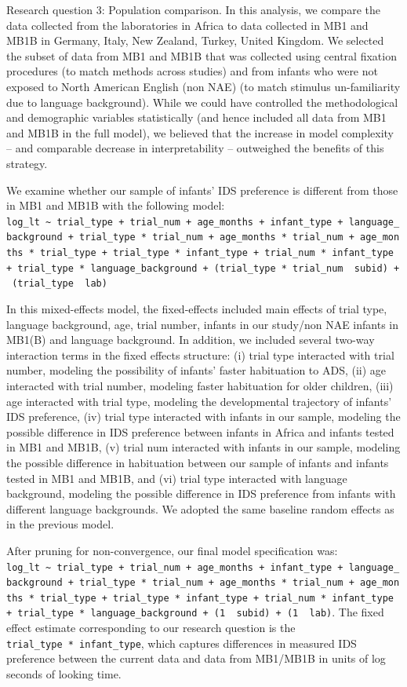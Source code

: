 \documentclass[
  ,man,floatsintext]{apa6}
\begin{document}
Research question 3: Population comparison. In this analysis, we compare the data collected from the laboratories in Africa to data collected in MB1 and MB1B in Germany, Italy, New Zealand, Turkey, United Kingdom. We selected the subset of data from MB1 and MB1B that was collected using central fixation procedures (to match methods across studies) and from infants who were not exposed to North American English (non NAE) (to match stimulus un-familiarity due to language background). While we could have controlled the methodological and demographic variables statistically (and hence included all data from MB1 and MB1B in the full model), we believed that the increase in model complexity -- and comparable decrease in interpretability -- outweighed the benefits of this strategy.

We examine whether our sample of infants' IDS preference is different from those in MB1 and MB1B with the following model:
\texttt{log\_lt\ \textasciitilde{}\ trial\_type\ +\ trial\_num\ +\ age\_months\ +\ infant\_type\ +\ language\_background\ +\ trial\_type\ *\ trial\_num\ +\ age\_months\ *\ trial\_num\ +\ age\_months\ *\ trial\_type\ +\ trial\_type\ *\ infant\_type\ +\ trial\_num\ *\ infant\_type\ +\ trial\_type\ *\ language\_background\ +\ (trial\_type\ *\ trial\_num\ \textbar{}\ subid)\ +\ (trial\_type\ \textbar{}\ lab)}

In this mixed-effects model, the fixed-effects included main effects of trial type, language background, age, trial number, infants in our study/non NAE infants in MB1(B) and language background. In addition, we included several two-way interaction terms in the fixed effects structure: (i) trial type interacted with trial number, modeling the possibility of infants' faster habituation to ADS, (ii) age interacted with trial number, modeling faster habituation for older children, (iii) age interacted with trial type, modeling the developmental trajectory of infants' IDS preference, (iv) trial type interacted with infants in our sample, modeling the possible difference in IDS preference between infants in Africa and infants tested in MB1 and MB1B, (v) trial num interacted with infants in our sample, modeling the possible difference in habituation between our sample of infants and infants tested in MB1 and MB1B, and (vi) trial type interacted with language background, modeling the possible difference in IDS preference from infants with different language backgrounds. We adopted the same baseline random effects as in the previous model.

After pruning for non-convergence, our final model specification was: \texttt{log\_lt\ \textasciitilde{}\ trial\_type\ +\ trial\_num\ +\ age\_months\ +\ infant\_type\ +\ language\_background\ +\ trial\_type\ *\ trial\_num\ +\ age\_months\ *\ trial\_num\ +\ age\_months\ *\ trial\_type\ +\ trial\_type\ *\ infant\_type\ +\ trial\_num\ *\ infant\_type\ +\ trial\_type\ *\ language\_background\ +\ (1\ \textbar{}\ subid)\ +\ (1\ \textbar{}\ lab)}. The fixed effect estimate corresponding to our research question is the \texttt{trial\_type\ *\ infant\_type}, which captures differences in measured IDS preference between the current data and data from MB1/MB1B in units of log seconds of looking time.
\end{document}
